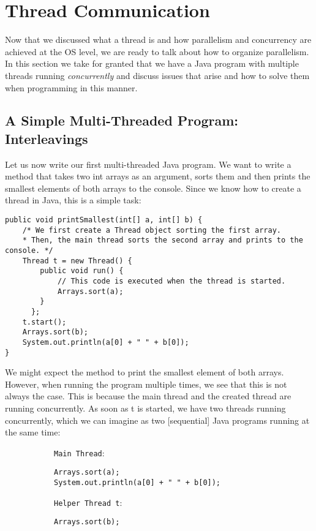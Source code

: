 \documentclass[main.tex]{subfiles}
\begin{document}
\addtolength{\tabcolsep}{-2pt}

\section{Thread Communication}
Now that we discussed what a thread is and how parallelism and concurrency are achieved at the OS level, we are ready to talk about how to organize parallelism.\\
In this section we take for granted that we have a Java program with multiple threads running \textit{concurrently} and discuss issues that arise and how to solve them when programming in this manner.

\subsection{A Simple Multi-Threaded Program: Interleavings} \label{interleavings}
Let us now write our first multi-threaded Java program. We want to write a method that takes two int arrays as an argument, sorts them and then prints the smallest elements of both arrays to the console. Since we know how to create a thread in Java, this is a simple task:
\begin{verbatim}
public void printSmallest(int[] a, int[] b) {
    /* We first create a Thread object sorting the first array.
    * Then, the main thread sorts the second array and prints to the console. */
    Thread t = new Thread() {
        public void run() {
            // This code is executed when the thread is started.
            Arrays.sort(a);
        }
      };
    t.start();
    Arrays.sort(b);
    System.out.println(a[0] + " " + b[0]);
}
\end{verbatim}
We might expect the method to print the smallest element of both arrays. However, when running the program multiple times, we see that this is not always the case. This is because the main thread and the created thread are running concurrently. As soon as t is started, we have two threads running concurrently, which we can imagine as two [sequential] Java programs running at the same time:
\begin{figure}[H]
    \begin{subfigure}[t]{.6\textwidth}
        \texttt{Main Thread}:
        \begin{verbatim}
Arrays.sort(a);
System.out.println(a[0] + " " + b[0]);
        \end{verbatim}
    \end{subfigure}%
    \begin{subfigure}[t]{.6\textwidth}
        \texttt{Helper Thread t}:
        \begin{verbatim}
Arrays.sort(b);
        \end{verbatim}
    \end{subfigure}
\end{figure}
\end{document}
